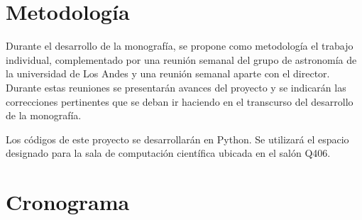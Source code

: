 \documentclass[12pt]{article}
\begin{document}
\section{Metodolog\'ia}



Durante el desarrollo de la monograf\'ia, se propone como metodolog\'ia el trabajo individual, complementado por una reuni\'on semanal del grupo de astronom\'ia de la universidad de Los Andes y una reuni\'on semanal aparte con el director. Durante estas reuniones se presentar\'an avances del proyecto y se indicar\'an las correcciones pertinentes que se deban ir haciendo en el transcurso del desarrollo de la monograf\'ia.

Los c\'odigos de este proyecto se desarrollar\'an en Python.
Se utilizar\'a el espacio designado para la sala de computaci\'on
cient\'ifica ubicada en el sal\'on Q406. 




\section{Cronograma}
\end{document}
